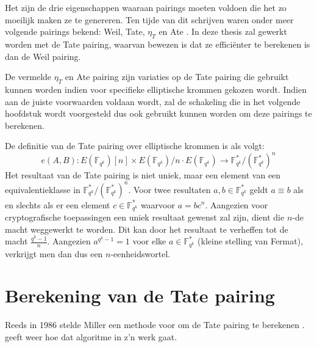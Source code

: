 Het zijn de drie eigenschappen waaraan pairings moeten voldoen die het zo moeilijk maken ze te genereren. Ten tijde van dit schrijven waren onder meer volgende pairings bekend: Weil, Tate, $\eta_T$ \cite{eta} en Ate \cite{ate}. In deze thesis zal gewerkt worden met de Tate pairing, waarvan bewezen is dat ze effici\"enter te berekenen is dan de Weil pairing.

De vermelde $\eta_T$ en Ate pairing zijn variaties op de Tate pairing die gebruikt kunnen worden indien voor specifieke elliptische krommen gekozen wordt. Indien aan de juiste voorwaarden voldaan wordt, zal de schakeling die in het volgende hoofdstuk wordt voorgesteld dus ook gebruikt kunnen worden om deze pairings te berekenen.

De definitie van de Tate pairing over elliptische krommen is als volgt:
\[e(A, B): E(\mathbb{F}_{q^k})[n] \times E(\mathbb{F}_{q^k})/n \cdot E(\mathbb{F}_{q^k}) \rightarrow \mathbb{F}_{q^k}^* / (\mathbb{F}_{q^k}^*)^n\]
Het resultaat van de Tate pairing is niet uniek, maar een element van een equivalentieklasse in $\mathbb{F}_{q^k}^* / (\mathbb{F}_{q^k}^*)^n$. Voor twee resultaten $a, b \in \mathbb{F}_{q^k}^*$ geldt $a \equiv b$ als en slechts als er een element $c \in \mathbb{F}_{q^k}^*$ waarvoor $a = bc^n$. Aangezien voor cryptografische toepassingen een uniek resultaat gewenst zal zijn, dient die $n$-de macht weggewerkt te worden. Dit kan door het resultaat te verheffen tot de macht $\frac{q^k - 1 }{n}$. Aangezien $a^{q^k - 1} = 1$ voor elke $a \in \mathbb{F}_{q^k}^*$ (kleine stelling van Fermat), verkrijgt men dan dus een $n$-eenheidswortel.

\section{Berekening van de Tate pairing}

Reeds in 1986 stelde Miller een methode voor om de Tate pairing te berekenen \cite{miller, barreto-efficient}.  geeft weer hoe dat algoritme  in z'n werk gaat.
